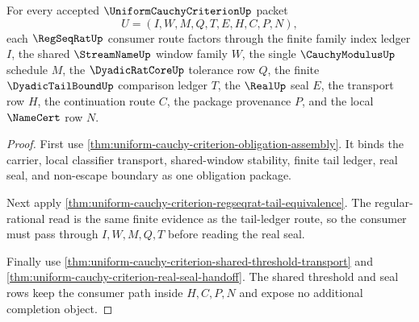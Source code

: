\begin{theorem}
\label{thm:uniform-cauchy-criterion-regseqrat-consumer-package}
For every accepted $\UniformCauchyCriterionUp$ packet
$$
U=(I,W,M,Q,T,E,H,C,P,N),
$$
each $\RegSeqRatUp$ consumer route factors through the finite family index
ledger $I$, the shared $\StreamNameUp$ window family $W$, the single
$\CauchyModulusUp$ schedule $M$, the $\DyadicRatCoreUp$ tolerance row $Q$, the
finite $\DyadicTailBoundUp$ comparison ledger $T$, the $\RealUp$ seal $E$, the
transport row $H$, the continuation route $C$, the package provenance $P$, and
the local $\NameCert$ row $N$.
\end{theorem}
\begin{proof}
First use \autoref{thm:uniform-cauchy-criterion-obligation-assembly}. It binds
the carrier, local classifier transport, shared-window stability, finite tail
ledger, real seal, and non-escape boundary as one obligation package.

Next apply
\autoref{thm:uniform-cauchy-criterion-regseqrat-tail-equivalence}. The
regular-rational read is the same finite evidence as the tail-ledger route, so
the consumer must pass through $I,W,M,Q,T$ before reading the real seal.

Finally use
\autoref{thm:uniform-cauchy-criterion-shared-threshold-transport} and
\autoref{thm:uniform-cauchy-criterion-real-seal-handoff}. The shared threshold
and seal rows keep the consumer path inside $H,C,P,N$ and expose no additional
completion object.
\end{proof}

